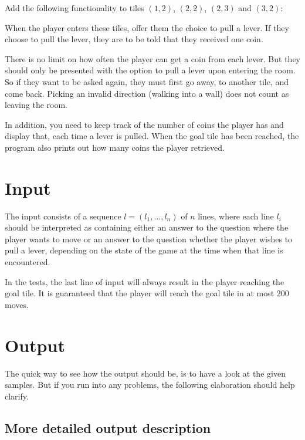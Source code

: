 
Add the following functionality to tiles $(1,2)$, $(2,2)$, $(2,3)$ and $(3,2)$:

When the player enters these tiles, offer them the choice to pull a lever.
If they choose to pull the lever,
they are to be told that they received one coin.

There is no limit on how often the player can get a coin from each lever.
But they should only be presented with the option to pull a lever
upon entering the room.
So if they want to be asked again, they must first go away, to another tile, and come back.
Picking an invalid direction (walking into a wall) does not count as leaving the room.

In addition, you need to keep track of the number of coins the player has
and display that, each time a lever is pulled.
When the goal tile has been reached,
the program also prints out how many coins the player retrieved.

\section*{Input}

The input consists of a sequence $l = (l_1, \dots, l_n)$ of $n$ lines,
where each line $l_i$ should be interpreted as containing
either an answer to the question where the player wants to move
or an answer to the question whether the player wishes to pull a lever,
depending on the state of the game at the time when that line is encountered.

In the tests, the last line of input will always result in
the player reaching the goal tile.
It is guaranteed that the player will reach the goal tile
in at most $200$ moves.

\section*{Output}

The quick way to see how the output should be,
is to have a look at the given samples.
But if you run into any problems,
the following elaboration should help clarify.

\subsection*{More detailed output description}

